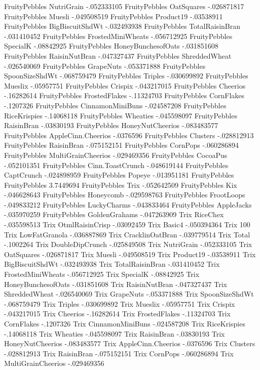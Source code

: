 FruityPebbles	NutriGrain	-.052333105
FruityPebbles	OatSquares	-.026871817
FruityPebbles	Muesli	-.049508519
FruityPebbles	Product19	-.03538911
FruityPebbles	BigBiscuitShdWt	-.032493938
FruityPebbles	TotalRaisinBran	-.031410452
FruityPebbles	FrostedMiniWheats	-.056712925
FruityPebbles	SpecialK	-.08842925
FruityPebbles	HoneyBunchesofOats	-.031851608
FruityPebbles	RaisinNutBran	-.047327437
FruityPebbles	ShreddedWheat	-.026540069
FruityPebbles	GrapeNuts	-.053371888
FruityPebbles	SpoonSizeShdWt	-.068759479
FruityPebbles	Triples	-.030699892
FruityPebbles	Mueslix	-.05957751
FruityPebbles	Crispix	-.043217015
FruityPebbles	Cheerios	-.16282614
FruityPebbles	FrostedFlakes	-.11324703
FruityPebbles	CornFlakes	-.1207326
FruityPebbles	CinnamonMiniBuns	-.024587208
FruityPebbles	RiceKrispies	-.14068118
FruityPebbles	Wheaties	-.045598097
FruityPebbles	RaisinBran	-.03830193
FruityPebbles	HoneyNutCheerios	-.083483577
FruityPebbles	AppleCinn.Cheerios	-.0376596
FruityPebbles	Clusters	-.028812913
FruityPebbles	RaisinBran	-.075152151
FruityPebbles	CornPops	-.060286894
FruityPebbles	MultiGrainCheerios	-.029469356
FruityPebbles	CocoaPus	-.052101351
FruityPebbles	Cinn.ToastCrunch	-.048619144
FruityPebbles	CaptCrunch	-.024898959
FruityPebbles	Popeye	-.013951181
FruityPebbles	FruityPebbles	3.7449694
FruityPebbles	Trix	-.052642509
FruityPebbles	Kix	-.046628643
FruityPebbles	Honeycomb	-.029598763
FruityPebbles	FrootLoops	-.049833212
FruityPebbles	LuckyCharms	-.043833464
FruityPebbles	AppleJacks	-.035970259
FruityPebbles	GoldenGrahams	-.047263909
Trix	RiceChex	-.035598513
Trix	OtmlRaisinCrisp	-.03092459
Trix	Basic4	-.050394364
Trix	100%
Trix	LowFatGranola	-.036887869
Trix	CracklinOatBran	-.039779514
Trix	Total	-.1002264
Trix	DoubleDipCrunch	-.025849508
Trix	NutriGrain	-.052333105
Trix	OatSquares	-.026871817
Trix	Muesli	-.049508519
Trix	Product19	-.03538911
Trix	BigBiscuitShdWt	-.032493938
Trix	TotalRaisinBran	-.031410452
Trix	FrostedMiniWheats	-.056712925
Trix	SpecialK	-.08842925
Trix	HoneyBunchesofOats	-.031851608
Trix	RaisinNutBran	-.047327437
Trix	ShreddedWheat	-.026540069
Trix	GrapeNuts	-.053371888
Trix	SpoonSizeShdWt	-.068759479
Trix	Triples	-.030699892
Trix	Mueslix	-.05957751
Trix	Crispix	-.043217015
Trix	Cheerios	-.16282614
Trix	FrostedFlakes	-.11324703
Trix	CornFlakes	-.1207326
Trix	CinnamonMiniBuns	-.024587208
Trix	RiceKrispies	-.14068118
Trix	Wheaties	-.045598097
Trix	RaisinBran	-.03830193
Trix	HoneyNutCheerios	-.083483577
Trix	AppleCinn.Cheerios	-.0376596
Trix	Clusters	-.028812913
Trix	RaisinBran	-.075152151
Trix	CornPops	-.060286894
Trix	MultiGrainCheerios	-.029469356
